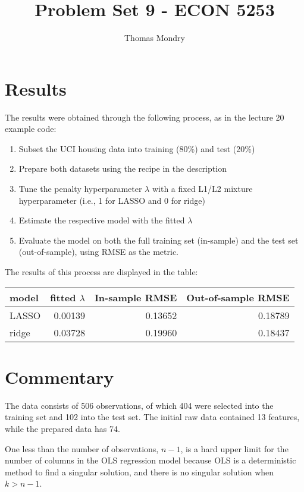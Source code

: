 \documentclass{article}
\title{Problem Set 9 - ECON 5253}
\author{Thomas Mondry}
\begin{document}
\maketitle

\section{Results}

The results were obtained through the following process, as in the lecture 20 example code:

\begin{enumerate}
	\item Subset the UCI housing data into training (80\%) and test (20\%)
	\item Prepare both datasets using the recipe in the description
	\item Tune the penalty hyperparameter $\lambda$ with a fixed L1/L2 mixture hyperparameter (i.e., 1 for LASSO and 0 for ridge)
	\item Estimate the respective model with the fitted $\lambda$
	\item Evaluate the model on both the full training set (in-sample) and the test set (out-of-sample), using RMSE as the metric.
\end{enumerate}

The results of this process are displayed in the table:

\begin{table}[H]
	\centering
\begin{tabular}{l|r|r|r}
	\hline
	model & fitted $\lambda$ & In-sample RMSE & Out-of-sample RMSE\\
	\hline
	LASSO & 0.00139 & 0.13652 & 0.18789\\
	\hline
	ridge & 0.03728 & 0.19960 & 0.18437\\
	\hline
\end{tabular}
\end{table}

\section{Commentary}

The data consists of 506 observations, of which 404 were selected into the training set and 102 into the test set. The initial raw data contained 13 features, while the prepared data has 74.

One less than the number of observations, $n-1$, is a hard upper limit for the number of columns in the OLS regression model because OLS is a deterministic method to find a singular solution, and there is no singular solution when $k>n-1$.
\end{document}
